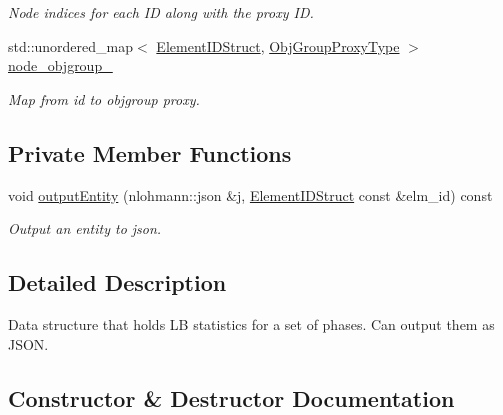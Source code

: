 \begin{DoxyCompactItemize}
\begin{DoxyCompactList}\small\item\em Node indices for each ID along with the proxy ID. \end{DoxyCompactList}\item 
std\+::unordered\+\_\+map$<$ \hyperlink{namespacevt_1_1vrt_1_1collection_1_1balance_a9f5b53fafb270212279a4757d2c4cd28}{Element\+I\+D\+Struct}, \hyperlink{namespacevt_ad7cae989df485fccca57f0792a880a8e}{Obj\+Group\+Proxy\+Type} $>$ \hyperlink{structvt_1_1vrt_1_1collection_1_1balance_1_1_stats_data_a1c281f52e1256426885206aa38f85670}{node\+\_\+objgroup\+\_\+}
\begin{DoxyCompactList}\small\item\em Map from id to objgroup proxy. \end{DoxyCompactList}\end{DoxyCompactItemize}
\subsection*{Private Member Functions}
\begin{DoxyCompactItemize}
\item 
void \hyperlink{structvt_1_1vrt_1_1collection_1_1balance_1_1_stats_data_a560439529230b8b96bd6bde6373ad124}{output\+Entity} (nlohmann\+::json \&j, \hyperlink{namespacevt_1_1vrt_1_1collection_1_1balance_a9f5b53fafb270212279a4757d2c4cd28}{Element\+I\+D\+Struct} const \&elm\+\_\+id) const
\begin{DoxyCompactList}\small\item\em Output an entity to json. \end{DoxyCompactList}\end{DoxyCompactItemize}


\subsection{Detailed Description}
Data structure that holds LB statistics for a set of phases. Can output them as J\+S\+ON. 

\subsection{Constructor \& Destructor Documentation}
\mbox{\label{structvt_1_1vrt_1_1collection_1_1balance_1_1_stats_data_a4456eb9f50cab15ee7cbd079603a4b6d}} 
